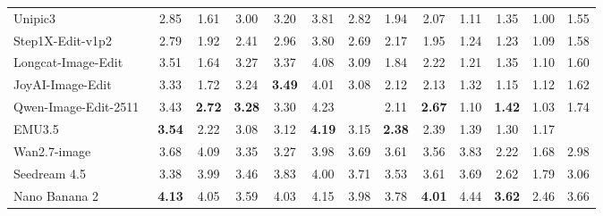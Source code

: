 \documentclass{llmxive}
\begin{document}
\begin{table}[t]
{\begin{tabular}{l|cccccc|cccccc}
            Unipic3~\cite{wei2026skywork}
            & 2.85 & 1.61 & 3.00 & 3.20 & 3.81 & \cellcolor[HTML]{C8C8C8}2.82 & 1.94 & 2.07 & 1.11 & 1.35 & 1.00
            & \cellcolor[HTML]{C8C8C8}1.55 \\

            Step1X-Edit-v1p2~\cite{liu2025step1x}
            & 2.79 & 1.92 & 2.41 & 2.96 & 3.80 & \cellcolor[HTML]{C8C8C8}2.69 & 2.17 & 1.95 & 1.24 & 1.23 & 1.09
            & \cellcolor[HTML]{C8C8C8}1.58 \\

            Longcat-Image-Edit~\cite{team2025longcat}
            & 3.51 & 1.64 & 3.27 & 3.37 & 4.08 & \cellcolor[HTML]{C8C8C8}3.09  & 1.84 & 2.22 & 1.21 & 1.35 & 1.10
            & \cellcolor[HTML]{C8C8C8}1.60 \\

            JoyAI-Image-Edit~\cite{joyaiimage2026}
            & 3.33 & 1.72 & 3.24 & \textbf{3.49} & 4.01 & \cellcolor[HTML]{C8C8C8}3.08 & 2.12 & 2.13 & 1.32 & 1.15 & 1.12
            & \cellcolor[HTML]{C8C8C8}1.62 \\

            Qwen-Image-Edit-2511~\cite{wu2025qwen}
            & 3.43 & \textbf{2.72} & \textbf{3.28} & 3.30 & 4.23 & \cellcolor[HTML]{C8C8C8}{\textbf{3.32}} & 2.11 & \textbf{2.67} & 1.10 & \textbf{1.42} & 1.03
            & \cellcolor[HTML]{C8C8C8}1.74 \\

            EMU3.5~\cite{cui2025emu3}
            & \textbf{3.54} & 2.22 & 3.08 & 3.12 & \textbf{4.19} & \cellcolor[HTML]{C8C8C8}3.15 & \textbf{2.38} & 2.39 & 1.39 & 1.30 & 1.17
            & \cellcolor[HTML]{C8C8C8}{\textbf{1.79}} \\ 

            

            \midrule

            Wan2.7-image~\cite{nanobananapro}
            & 3.68 & 4.09 & 3.35 & 3.27 & 3.98 & \cellcolor[HTML]{C8C8C8}3.69 & 3.61 & 3.56 & 3.83 & 2.22 & 1.68
            & \cellcolor[HTML]{C8C8C8} 2.98  \\

            Seedream 4.5~\cite{seedream2025seedream}
            & 3.38 & 3.99 & 3.46 & 3.83 & 4.00 & \cellcolor[HTML]{C8C8C8}3.71 & 3.53 & 3.61 & 3.69 & 2.62 & 1.79
            & \cellcolor[HTML]{C8C8C8}3.06 \\

            Nano Banana 2~\cite{gemini3pro}
            & \textbf{4.13} & 4.05 & 3.59 & 4.03 & 4.15 & \cellcolor[HTML]{C8C8C8}3.98 & 3.78 & \textbf{4.01} & 4.44 & \textbf{3.62} & 2.46
            & \cellcolor[HTML]{C8C8C8} 3.66  \\


\end{tabular}}
\end{table}
\end{document}
